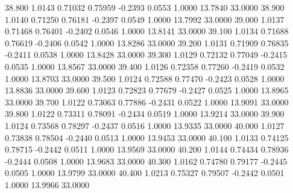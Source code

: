   38.800   1.0143   0.71032   0.75959  -0.2393   0.0553   1.0000  13.7840  33.0000
  38.900   1.0140   0.71250   0.76181  -0.2397   0.0549   1.0000  13.7992  33.0000
  39.000   1.0137   0.71468   0.76401  -0.2402   0.0546   1.0000  13.8141  33.0000
  39.100   1.0134   0.71688   0.76619  -0.2406   0.0542   1.0000  13.8286  33.0000
  39.200   1.0131   0.71909   0.76835  -0.2411   0.0538   1.0000  13.8428  33.0000
  39.300   1.0129   0.72132   0.77049  -0.2415   0.0535   1.0000  13.8567  33.0000
  39.400   1.0126   0.72358   0.77260  -0.2419   0.0532   1.0000  13.8703  33.0000
  39.500   1.0124   0.72588   0.77470  -0.2423   0.0528   1.0000  13.8836  33.0000
  39.600   1.0123   0.72823   0.77679  -0.2427   0.0525   1.0000  13.8965  33.0000
  39.700   1.0122   0.73063   0.77886  -0.2431   0.0522   1.0000  13.9091  33.0000
  39.800   1.0122   0.73311   0.78091  -0.2434   0.0519   1.0000  13.9214  33.0000
  39.900   1.0124   0.73568   0.78297  -0.2437   0.0516   1.0000  13.9335  33.0000
  40.000   1.0127   0.73838   0.78504  -0.2440   0.0513   1.0000  13.9453  33.0000
  40.100   1.0133   0.74125   0.78715  -0.2442   0.0511   1.0000  13.9569  33.0000
  40.200   1.0144   0.74434   0.78936  -0.2444   0.0508   1.0000  13.9683  33.0000
  40.300   1.0162   0.74780   0.79177  -0.2445   0.0505   1.0000  13.9799  33.0000
  40.400   1.0213   0.75327   0.79507  -0.2442   0.0501   1.0000  13.9966  33.0000
